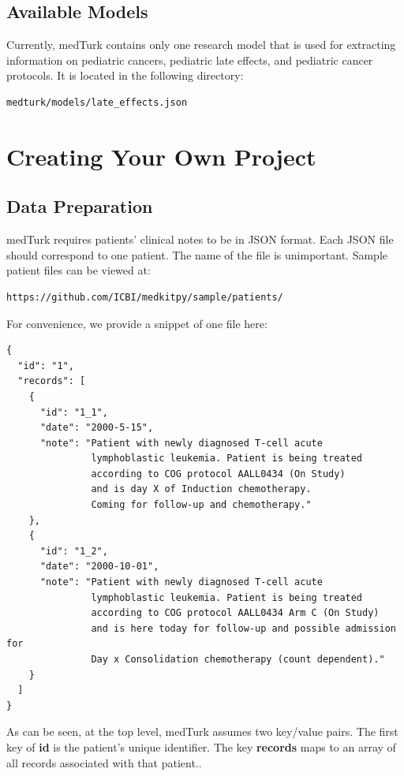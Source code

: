 \documentclass{book}
\begin{document}
\section{Available Models}
Currently, medTurk contains only one research model that is used for extracting information on pediatric cancers, pediatric late effects, and pediatric cancer protocols. It is located in the following directory:

\begin{verbatim}
medturk/models/late_effects.json
\end{verbatim}




\chapter{Creating Your Own Project}

\section{Data Preparation}
medTurk requires patients' clinical notes to be in JSON format. Each JSON file should correspond to one patient. The name of the file is unimportant. Sample patient files can be viewed at:

\begin{verbatim}
https://github.com/ICBI/medkitpy/sample/patients/
\end{verbatim}

For convenience, we provide a snippet of one file here:
\begin{verbatim}
{
  "id": "1",
  "records": [
    {
      "id": "1_1",
      "date": "2000-5-15",
      "note": "Patient with newly diagnosed T-cell acute 
               lymphoblastic leukemia. Patient is being treated 
               according to COG protocol AALL0434 (On Study) 
               and is day X of Induction chemotherapy.
               Coming for follow-up and chemotherapy."
    },
    {
      "id": "1_2",
      "date": "2000-10-01",
      "note": "Patient with newly diagnosed T-cell acute
               lymphoblastic leukemia. Patient is being treated
               according to COG protocol AALL0434 Arm C (On Study)
               and is here today for follow-up and possible admission for
               Day x Consolidation chemotherapy (count dependent)."
    }
  ]
}
\end{verbatim}

As can be seen, at the top level, medTurk assumes two key/value pairs. The first key of \textbf{id} is the patient's unique identifier. The key \textbf{records} maps to an array of all records associated with that patient..
\end{document}
